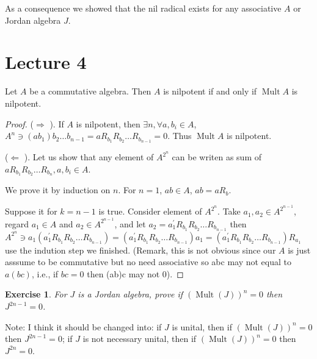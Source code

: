 \documentclass{article}
\newtheorem{exercise}[theorem]{Exercise}
\begin{document}
As a consequence we showed that the nil radical exists for any associative $ A $ or Jordan algebra $ J $.

\section{Lecture 4}

\begin{lemma} 
Let $ A $ be a commutative algebra. Then $ A $ is nilpotent if and only if $ \operatorname{Mult}A $ is nilpotent.   
\end{lemma}

\begin{proof} 
($ \Rightarrow $ ). If $ A $ is nilpotent, then $\exists n, \forall a,b_i \in A $, $ A^n \ni (ab_1)b_2 \ldots b_{n-1} =a R_{b_1}R_{b_2}\ldots R_{b_{n-1}} =0 $. Thus $ \operatorname{Mult}A $ is nilpotent.

($ \Leftarrow $ ). Let us show that any element of $ A^{2^n} $ can be writen as sum of $ aR_{b_1}R_{b_2}\ldots R_{b_{n}} , a,b_i \in A$.

We prove it by induction on $ n $. For $ n=1 $, $ ab \in A $, $ ab=aR_b $.

Suppose it for $ k=n-1 $ is true. Consider element of $ A^{2^n} $. Take $ a_1,a_2 \in A^{2^{n-1}} $, regard $ a_1 \in A $ and $ a_2 \in A^{2^{n-1}} $, and let $ a_2=a_1^{\prime }R_{b_1}R_{b_2}\ldots R_{b_{n-1}}$ then $ A^{2^n}\ni a_1 (a_1^{\prime }R_{b_1}R_{b_2}\ldots R_{b_{n-1}}) =(a_1^{\prime }R_{b_1}R_{b_2}\ldots R_{b_{n-1}}) a_1= (a_1^{\prime }R_{b_1}R_{b_2}\ldots R_{b_{n-1}}) R_{a_1}$ use the indution step we finished. (Remark, this is not obvious since our $ A $ is just asssume to be commutative but no need associative so abc may not equal to $ a(bc) $, i.e., if $ bc=0 $ then (ab)c may not 0).     
\end{proof}

\begin{exercise}
For $ J $ is a Jordan algebra, prove if $ (\operatorname{Mult}(J))^{n}=0 $ then $ J^{2n-1}=0 $.   
\end{exercise}

\begin{tcolorbox}[colback=gray!20, colframe=black] 
Note: I think it should be changed into: if $ J $ is unital, then if $ (\operatorname{Mult}(J))^{n}=0 $ then $ J^{2n-1}=0 $; if $ J $ is not necessary unital, then if $ (\operatorname{Mult}(J))^{n}=0 $ then $ J^{2n}=0 $.
\end{tcolorbox}
\end{document}
